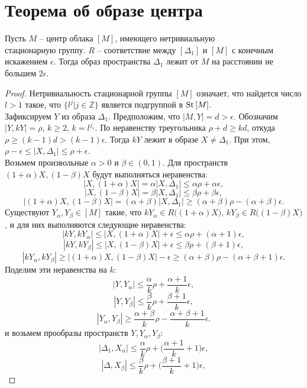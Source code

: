 
\section{Теорема об образе центра}
\begin{theorem}
Пусть $M$ -- центр облака $[M]$, имеющего нетривиальную
\\стационарную группу. $R$ -- соответствие между $[\Delta_{1}]$ и $[M]$ с конечным
искажением $\epsilon$. Тогда образ пространства $\Delta_{1}$ лежит от $M$ на
расстоянии не большем $2\epsilon$.
\end{theorem}
\begin{proof}
Нетривиальность стационарной группы $[M]$ означает, что найдется
число $l > 1$ такое, что $\{l^{j}|j\in \mathbb{Z}\}$ является подгруппой в
$\operatorname{St}{[M]}$.\\
Зафиксируем $Y$ из образа $\Delta_{1}$.
Предположим, что $|M, Y| = d > \epsilon$.  Обозначим
$|Y, kY| = \rho$, $k \ge 2$, $k = l^{j_{1}}$. По неравенству треугольника $\rho + d \ge kd$,
откуда $\rho \ge (k-1)d > (k-1)\epsilon$. Тогда $kY$ лежит в образе
$X \ne \Delta_1$. При этом,
$\rho - \epsilon \le |X, \Delta_1| \le \rho + \epsilon$. \\
Возьмем произвольные $\alpha > 0$ и $\beta \in (0,1)$. Для пространств $(1+\alpha)X, (1-\beta)X$ будут выполняться неравенства:
	$$|X, (1+\alpha)X| = \alpha |X, \Delta_1| \le \alpha\rho + \alpha\epsilon,$$
	$$|X, (1-\beta)X| = \beta|X, \Delta_1| \le \beta\rho + \beta\epsilon,$$
	$$|(1+\alpha) X, (1-\beta)X| = (\alpha + \beta)|X, \Delta_1| \ge (\alpha+\beta)\rho - (\alpha+\beta)\epsilon.$$
 Существуют
$Y_\alpha, Y_\beta \in [M]$ такие, что
$kY_\alpha \in R\big((1+\alpha)X\big)$, $kY_\beta \in R\big((1-\beta)X\big)$, и
для них выполняются следующие неравенства:
	$$|kY, kY_\alpha| \le |X, (1+\alpha)X| + \epsilon \le \alpha\rho + (\alpha+1)\epsilon,$$
	$$|kY, kY_\beta| \le |X, (1-\beta)X| + \epsilon \le \beta\rho + (\beta+1)\epsilon,$$
	$$|kY_\alpha, kY_\beta| \ge |(1+\alpha)X, (1-\beta)X| - \epsilon \ge  (\alpha+\beta)\rho - (\alpha+\beta+1)\epsilon.$$
	Поделим эти неравенства на $k$:
	$$|Y, Y_{\alpha}| \le \frac{\alpha}{k}\rho + \frac{\alpha+1}{k}\epsilon,$$
	$$|Y, Y_{\beta}| \le \frac{\beta}{k}\rho + \frac{\beta+1}{k}\epsilon,$$
	$$|Y_\alpha, Y_{\beta}| \ge \frac{\alpha+\beta}{k}\rho - \frac{\alpha+\beta+1}{k}\epsilon.$$
	и возьмем прообразы пространств $Y, Y_{\alpha}, Y_{\beta}$:
	$$|\Delta_1, X_{\alpha}| \le \frac{\alpha}{k}\rho + \big(\frac{\alpha+1}{k} + 1\big)\epsilon,$$
	$$|\Delta, X_{\beta}| \le \frac{\beta}{k}\rho + \big(\frac{\beta+1}{k}+1\big)\epsilon,$$

\end{proof}

